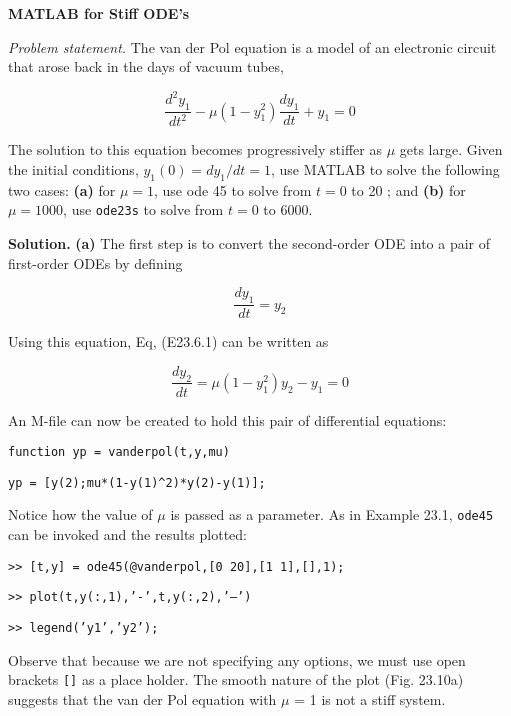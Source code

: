 \documentclass[../main.tex]{subfiles}
\begin{document}
\begin{exmp}
    \textbf{MATLAB for Stiff ODE's}

    \noindent \textit{Problem statement.} The van der Pol equation is a model of an electronic circuit that
    arose back in the days of vacuum tubes,

    \begin{equation}
        \tag{E23.6.1}
        \frac{d^{2} y_{1}}{d t^{2}}-\mu\left(1-y_{1}^{2}\right) \frac{d y_{1}}{d t}+y_{1}=0
    \end{equation}

    The solution to this equation becomes progressively stiffer as $\mu$ gets large. Given the initial conditions, $y_{1}(0)=d y_{1} / d t=1$, use MATLAB to solve the following two cases: \textbf{(a)} for $\mu=1$, use ode 45 to solve from $t=0$ to 20 ; and \textbf{(b)} for $\mu=1000$, use \texttt{ode23s} to solve from $t=0$ to 6000.

    \noindent \textbf{Solution.} \textbf{(a)} The first step is to convert the second-order ODE into a pair of first-order ODEs by defining

    \begin{equation}
        \frac{dy_1}{dt}=y_2 \nonumber
    \end{equation}

    \noindent Using this equation, Eq, (E23.6.1) can be written as

    \begin{equation}
        \frac{d y_{2}}{d t}=\mu\left(1-y_{1}^{2}\right) y_{2}-y_{1}=0 \nonumber 
    \end{equation}

    \noindent An M-file can now be created to hold this pair of differential equations:

    \texttt{function yp = vanderpol(t,y,mu)}

    \texttt{yp = [y(2);mu*(1-y(1)\^{}2)*y(2)-y(1)];}

    \noindent Notice how the value of $\mu$ is passed as a parameter. As in Example 23.1, \texttt{ode45} can be invoked and the results plotted:

    \noindent \texttt{>> [t,y] = ode45(@vanderpol,[0 20],[1 1],[],1);}

    \noindent \texttt{>> plot(t,y(:,1),'-',t,y(:,2),'--')}

    \noindent \texttt{>> legend('y1','y2');}

    \noindent Observe that because we are not specifying any options, we must use open brackets \texttt{[]} as
    a place holder. The smooth nature of the plot (Fig. 23.10a) suggests that the van der Pol
    equation with $\mu$ = 1 is not a stiff system.\vspace{1mm}


\end{exmp}
\end{document}
